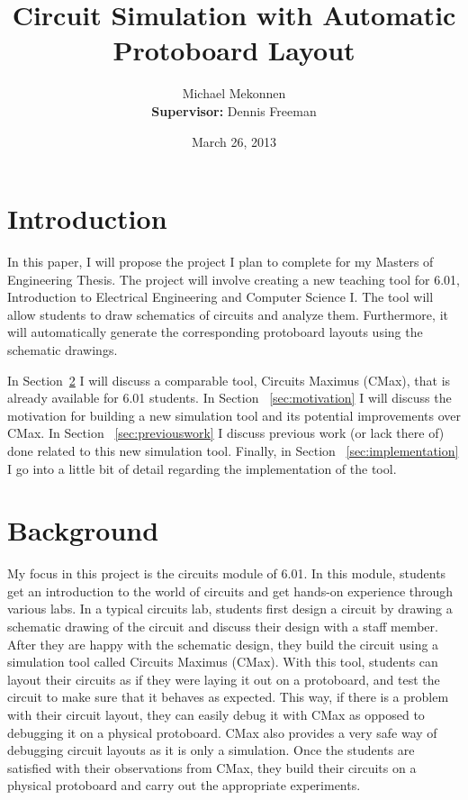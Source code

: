 \documentclass[12pt, doublespacing]{amsart}
\title{Circuit Simulation with Automatic Protoboard Layout}
\author{Michael Mekonnen \\ \textbf{Supervisor:} Dennis Freeman}
\date{March 26, 2013}
\begin{document}
\maketitle

\section{Introduction}

In this paper, I will propose the project I plan to complete for my Masters of Engineering Thesis. The project will involve creating a new teaching tool for 6.01, Introduction to Electrical Engineering and Computer Science I. The tool will allow students to draw schematics of circuits and analyze them. Furthermore, it will automatically generate the corresponding protoboard layouts using the schematic drawings.

In Section~\ref{sec:background} I will discuss a comparable tool, Circuits Maximus (CMax), that is already available for 6.01 students. In Section ~\ref{sec:motivation} I will discuss the motivation for building a new simulation tool and its potential improvements over CMax. In Section ~\ref{sec:previouswork} I discuss previous work (or lack there of) done related to this new simulation tool. Finally, in Section ~\ref{sec:implementation} I go into a little bit of detail regarding the implementation of the tool.

\section{Background}
\label{sec:background}

My focus in this project is the circuits module of 6.01. In this module, students get an introduction to the world of circuits and get hands-on experience through various labs. In a typical circuits lab, students first design a circuit by drawing a schematic drawing of the circuit and discuss their design with a staff member. After they are happy with the schematic design, they build the circuit using a simulation tool called Circuits Maximus (CMax)\cite{cmax}. With this tool, students can layout their circuits as if they were laying it out on a protoboard, and test the circuit to make sure that it behaves as expected. This way, if there is a problem with their circuit layout, they can easily debug it with CMax as opposed to debugging it on a physical protoboard. CMax also provides a very safe way of debugging circuit layouts as it is only a simulation. Once the students are satisfied with their observations from CMax, they build their circuits on a physical protoboard and carry out the appropriate experiments.
\end{document}
